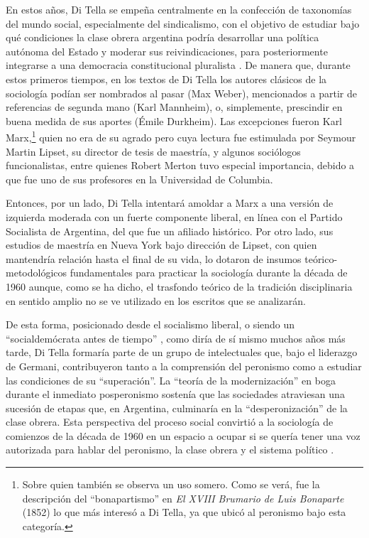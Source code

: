 En estos años, Di Tella se empeña centralmente en la confección de taxonomías del mundo social, especialmente del sindicalismo, con el objetivo de estudiar bajo qué condiciones la clase obrera argentina podría desarrollar una política autónoma del Estado y moderar sus reivindicaciones, para posteriormente integrarse a una democracia constitucional pluralista \parencite{1649-DITELLA1964,1650-DITELLA1969,1651-DITELLA1967}. De manera que, durante estos primeros tiempos, en los textos de Di Tella los autores clásicos de la sociología podían ser nombrados al pasar (Max Weber), mencionados a partir de referencias de segunda mano (Karl Mannheim), o, simplemente, prescindir en buena medida de sus aportes (Émile Durkheim). Las excepciones fueron Karl Marx,\footnote{Sobre quien también se observa un uso somero. Como se verá, fue la descripción del \enquote{bonapartismo} en \emph{El XVIII Brumario de Luis Bonaparte} (1852) lo que más interesó a Di Tella, ya que ubicó al peronismo bajo esta categoría.} quien no era de su agrado pero cuya lectura fue estimulada por Seymour Martin Lipset, su director de tesis de maestría, y algunos sociólogos funcionalistas, entre quienes Robert Merton tuvo especial importancia, debido a que fue uno de sus profesores en la Universidad de Columbia.

Entonces, por un lado, Di Tella intentará amoldar a Marx a una versión de izquierda moderada con un fuerte componente liberal, en línea con el Partido Socialista de Argentina, del que fue un afiliado histórico. Por otro lado, sus estudios de maestría en Nueva York bajo dirección de Lipset, con quien mantendría relación hasta el final de su vida, lo dotaron de insumos teórico-metodológicos fundamentales para practicar la sociología durante la década de 1960 aunque, como se ha dicho, el trasfondo teórico de la tradición disciplinaria en sentido amplio no se ve utilizado en los escritos que se analizarán.

De esta forma, posicionado desde el socialismo liberal, o siendo un \enquote{socialdemócrata antes de tiempo} \parencite[283]{1553-CAMOU2009}, como diría de sí mismo muchos años más tarde, Di Tella formaría parte de un grupo de intelectuales que, bajo el liderazgo de Germani, contribuyeron tanto a la comprensión del peronismo como a estudiar las condiciones de su \enquote{superación}. La \enquote{teoría de la modernización} en boga durante el inmediato posperonismo sostenía que las sociedades atraviesan una sucesión de etapas que, en Argentina, culminaría en la \enquote{desperonización} de la clase obrera. Esta perspectiva del proceso social convirtió a la sociología de comienzos de la década de 1960 en un espacio a ocupar si se quería tener una voz autorizada para hablar del peronismo, la clase obrera y el sistema político \parencite{1548-NEIBURG1998}.

